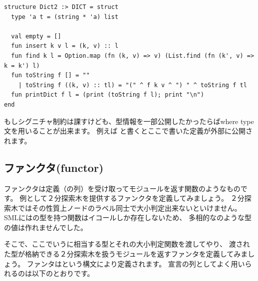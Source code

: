 \documentclass[11pt,a4paper]{article}
\begin{document}
\begin{lstlisting}[caption=リストによる辞書の実装,label=code:list-dict]
structure Dict2 :> DICT = struct
  type 'a t = (string * 'a) list

  val empty = []
  fun insert k v l = (k, v) :: l
  fun find k l = Option.map (fn (k, v) => v) (List.find (fn (k', v) => k = k') l)
  fun toString f [] = ""
    | toString f ((k, v) :: tl) = "(" ^ f k v ^ ") " ^ toString f tl
  fun printDict f l = (print (toString f l); print "\n")
end
\end{lstlisting}

もしシグニチャ制約は課すけども、型情報を一部公開したかったらばwhere type文を用いることが出来ます。
例えば
と書くとここで書いた定義が外部に公開されます。

\subsection{ファンクタ(functor)}

ファンクタは定義（の列）を受け取ってモジュールを返す関数のようなものです。
例として２分探索木を提供するファンクタを定義してみましょう。
２分探索木ではその性質上ノードのラベル同士で大小判定出来ないといけません。
SMLにはの型を持つ関数はイコールしか存在しないため、
多相的なのような型の値は作れませんでした。

そこで、ここでいうに相当する型とそれの大小判定関数を渡してやり、
渡された型が格納できる２分探索木を扱うモジュールを返すファンタを定義してみましょう。
ファンタはという構文により定義されます。
宣言の列としてよく用いられるのは以下のとおりです。
\end{document}
